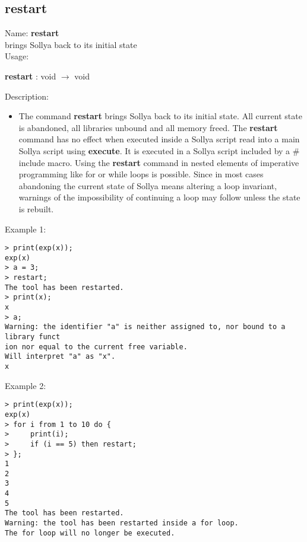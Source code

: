 \subsection{restart}
\label{labrestart}
\noindent Name: \textbf{restart}\\
brings Sollya back to its initial state\\

\noindent Usage: 
\begin{center}
\textbf{restart} : \textsf{void} $\rightarrow$ \textsf{void}\\
\end{center}
\noindent Description: \begin{itemize}

\item The command \textbf{restart} brings Sollya back to its initial state.  All
   current state is abandoned, all libraries unbound and all memory freed.
   The \textbf{restart} command has no effect when executed inside a Sollya
   script read into a main Sollya script using \textbf{execute}. It is executed
   in a Sollya script included by a $\#$include macro.
   Using the \textbf{restart} command in nested elements of imperative
   programming like for or while loops is possible. Since in most cases
   abandoning the current state of Sollya means altering a loop
   invariant, warnings of the impossibility of continuing a loop may
   follow unless the state is rebuilt.
\end{itemize}
\noindent Example 1: 
\begin{center}\begin{minipage}{15cm}\begin{Verbatim}[frame=single]
> print(exp(x));
exp(x)
> a = 3;
> restart;
The tool has been restarted.
> print(x);
x
> a;
Warning: the identifier "a" is neither assigned to, nor bound to a library funct
ion nor equal to the current free variable.
Will interpret "a" as "x".
x
\end{Verbatim}
\end{minipage}\end{center}
\noindent Example 2: 
\begin{center}\begin{minipage}{15cm}\begin{Verbatim}[frame=single]
> print(exp(x));
exp(x)
> for i from 1 to 10 do {
>     print(i);
>     if (i == 5) then restart;
> };
1
2
3
4
5
The tool has been restarted.
Warning: the tool has been restarted inside a for loop.
The for loop will no longer be executed.
\end{Verbatim}
\end{minipage}\end{center}
